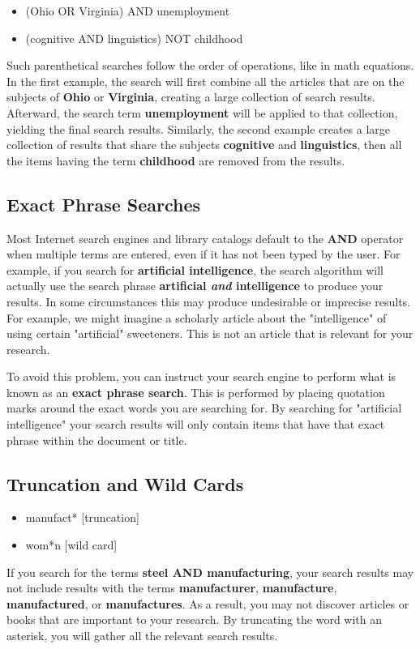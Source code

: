 \begin{itemize} \item (Ohio OR Virginia) AND unemployment \item (cognitive AND
linguistics) NOT childhood \end{itemize} Such parenthetical searches follow the
order of operations, like in math  equations. In the first example, the search
will first combine all the articles  that are on the subjects of \textbf{Ohio}
or \textbf{Virginia}, creating a  large collection of search results. Afterward,
the search term  \textbf{unemployment} will be applied to that collection,
yielding the final search results. Similarly, the second example creates a
large collection of results that share the subjects \textbf{cognitive} and
\textbf{linguistics}, then all the items having the term \textbf{childhood}
are removed from the results.

\subsection{Exact Phrase Searches}

Most Internet search engines and library catalogs default to the \textbf{AND}
operator when multiple terms are entered, even if it has not been typed by the
user. For example, if you search for \textbf{artificial intelligence}, the
search algorithm will actually use the search phrase \textbf{artificial
\emph{and} intelligence} to produce your results. In some circumstances this
may produce undesirable or imprecise results. For example, we might imagine a scholarly article about the "intelligence" of using certain "artificial" sweeteners. This is not an article that is relevant for your research. 

To avoid this problem, you can instruct your search engine to perform what is
known as an \textbf{exact phrase search}. This is performed by placing
quotation marks around the exact words you are searching for. By searching
for "artificial intelligence" your search results will only contain items that
have that exact phrase within the document or title.

\subsection{Truncation and Wild Cards} \begin{itemize} \item manufact\**
[truncation] \item wom\**n [wild card] \end{itemize} If you search for the terms
\textbf{steel AND manufacturing}, your search  results may not include results
with the terms \textbf{manufacturer},  \textbf{manufacture},
\textbf{manufactured}, or \textbf{manufactures}. As a result, you may not
discover articles or books that are important to your research. By truncating
the word with an asterisk, you will gather all the relevant search results.

